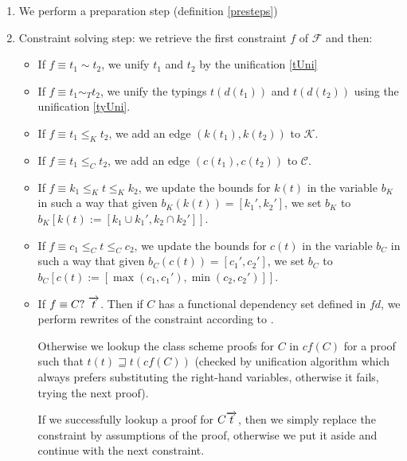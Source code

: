 \begin{enumerate}
    \item We perform a preparation step (definition \ref{presteps}) \label{prestep_step}

    \item Constraint solving step: we retrieve the first constraint $f$ of $\mathcal{F}$ and then:

    \begin{itemize}
        \item If $f \equiv t_1 \sim t_2$, we unify $t_1$ and $t_2$ by the unification \ref{tUni}

        \item If $f \equiv t_1 \sim_T t_2$, we unify the typings $t (d (t_1))$ and $t (d (t_2))$ using the unification \ref{tyUni}.

        \item If $f \equiv t_1 \leq_K t_2$, we add an edge $(k(t_1), k(t_2))$ to $\mathcal{K}$.

        \item If $f \equiv t_1 \leq_C t_2$, we add an edge $(c(t_1), c(t_2))$ to $\mathcal{C}$.

        \item If $f \equiv k_1 \leq_K t \leq_K k_2$, we update the bounds for $k(t)$ in the variable $b_K$ in such a way that given $b_K(k(t)) = [k_1', k_2']$, we set $b_K$ to $b_K[ k(t) := [k_1 \cup k_1', k_2 \cap k_2'] ]$.

        \item If $f \equiv c_1 \leq_C t \leq_C c_2$, we update the bounds for $c(t)$ in the variable $b_C$ in such a way that given $b_C(c(t)) = [c_1', c_2']$, we set $b_C$ to $b_C[ c(t) := [\max (c_1, c_1'), \min (c_2,  c_2')] ]$.

        \item If $f \equiv C?\ \overrightarrow{t}$. Then if $C$ has a functional dependency set defined in $fd$, we perform rewrites of the constraint according to .

        Otherwise we lookup the class scheme proofs for $C$ in $cf(C)$ for a proof such that $t(t) \sqsupseteq t(cf(C))$ (checked by unification algorithm which always prefers substituting the right-hand variables, otherwise it fails, trying the next proof).

        If we successfully lookup a proof for $C \overrightarrow{t}$, then we simply replace the constraint by assumptions of the proof, otherwise we put it aside and continue with the next constraint.


\end{itemize}
\end{enumerate}
